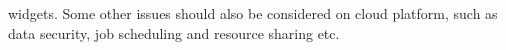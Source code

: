 widgets. Some other issues should also be considered on cloud platform, such as data security, job scheduling and resource sharing etc.   




